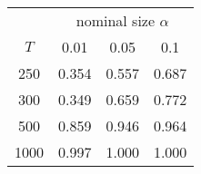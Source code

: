 % 
\begin{tabular}{cccc}
  \hline
  & \multicolumn{3}{c}{nominal size $\alpha$} \\
 $T$ & 0.01 & 0.05 & 0.1 \\
 \hline
250 & 0.354 & 0.557 & 0.687 \\ 
  300 & 0.349 & 0.659 & 0.772 \\ 
  500 & 0.859 & 0.946 & 0.964 \\ 
  1000 & 0.997 & 1.000 & 1.000 \\ 
   \hline
\end{tabular}
